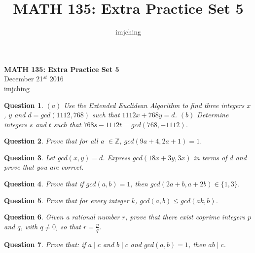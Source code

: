\documentclass[11pt,oneside]{article}
\title{MATH 135: Extra Practice Set 5}
\author{imjching}
\newtheorem{question}{Question}
\begin{document}
\begin{center}
    \textbf{MATH 135: Extra Practice Set 5} \\
    December 21$^{st}$ 2016 \\

    imjching
\end{center}

\bigskip


\begin{question}
	$(a)$ Use the Extended Euclidean Algorithm to find three integers $x$, $y$ and $d = gcd(1112, 768)$ such that $1112x + 768y = d$. $(b)$ Determine integers $s$ and $t$ such that $768s - 1112t = gcd(768, -1112)$.
\end{question}

\bigskip

\begin{question}
	Prove that for all a $\in \mathbb{Z}$, $gcd(9a + 4, 2a + 1) = 1$.
\end{question}

\bigskip

\begin{question}
	Let $gcd(x, y) = d$. Express $gcd(18x + 3 y, 3x)$ in terms of $d$ and prove that you are correct.
\end{question}

\bigskip

\begin{question}
	Prove that if $gcd(a, b) = 1$, then $gcd(2a + b, a + 2b) \in \{1, 3\}$.
\end{question}

\bigskip

\begin{question}
	Prove that for every integer $k$, $gcd(a, b) \leq gcd(ak, b)$.
\end{question}

\bigskip

\begin{question}
	Given a rational number $r$, prove that there exist coprime integers $p$ and $q$, with $q \neq 0$, so that $r = \frac{p}{q}$.
\end{question}

\bigskip

\begin{question}
	Prove that: if $a \mid c$ and $b \mid c$ and $gcd(a, b) = 1$, then $ab \mid c$.
\end{question}
\end{document}
